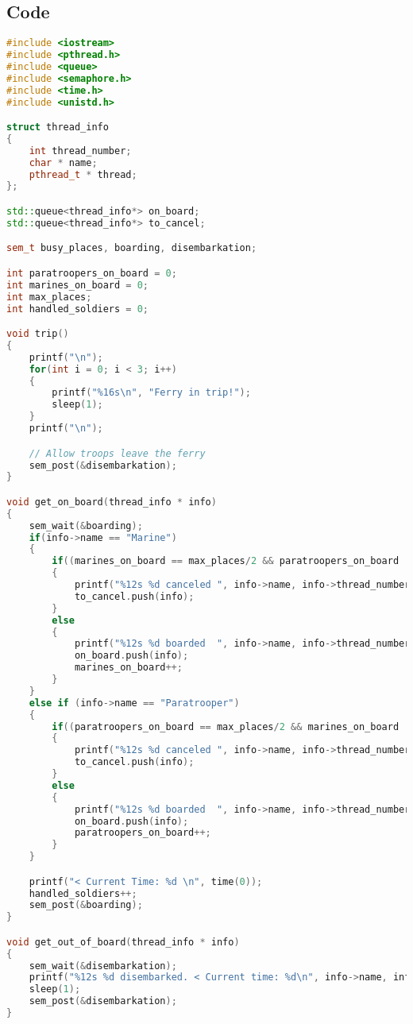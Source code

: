 \documentclass{article}
\begin{document}
\subsection{Code}
\begin{lstlisting}[language=C++]
#include <iostream>
#include <pthread.h>
#include <queue>
#include <semaphore.h>
#include <time.h>
#include <unistd.h>

struct thread_info 
{
    int thread_number;
    char * name;
    pthread_t * thread;
};

std::queue<thread_info*> on_board;
std::queue<thread_info*> to_cancel;

sem_t busy_places, boarding, disembarkation;

int paratroopers_on_board = 0;
int marines_on_board = 0;
int max_places;
int handled_soldiers = 0;

void trip()
{
    printf("\n");
    for(int i = 0; i < 3; i++)
    {
        printf("%16s\n", "Ferry in trip!");
        sleep(1);
    }
    printf("\n");

    // Allow troops leave the ferry
    sem_post(&disembarkation);
}

void get_on_board(thread_info * info)
{
    sem_wait(&boarding);
    if(info->name == "Marine")
    {
        if((marines_on_board == max_places/2 && paratroopers_on_board != 0) || (paratroopers_on_board > max_places/2))
        {
            printf("%12s %d canceled ", info->name, info->thread_number);
            to_cancel.push(info);
        } 
        else
        {
            printf("%12s %d boarded  ", info->name, info->thread_number);
            on_board.push(info);
            marines_on_board++;
        }
    }
    else if (info->name == "Paratrooper")
    {
        if((paratroopers_on_board == max_places/2 && marines_on_board != 0) || (marines_on_board > max_places/2))
        {
            printf("%12s %d canceled ", info->name, info->thread_number);
            to_cancel.push(info);
        }        
        else
        {
            printf("%12s %d boarded  ", info->name, info->thread_number);
            on_board.push(info);
            paratroopers_on_board++;
        }
    }

    printf("< Current Time: %d \n", time(0));
    handled_soldiers++;
    sem_post(&boarding);
}

void get_out_of_board(thread_info * info)
{
    sem_wait(&disembarkation);
    printf("%12s %d disembarked. < Current time: %d\n", info->name, info->thread_number, time(0));
    sleep(1);
    sem_post(&disembarkation);
}


\end{lstlisting}
\end{document}
